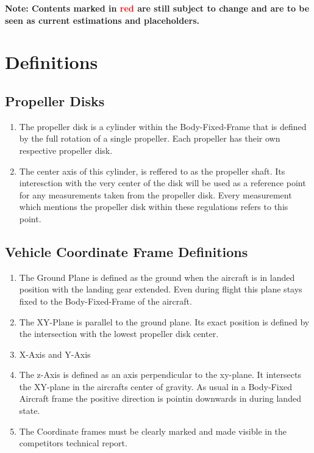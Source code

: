 \documentclass{article}
\begin{document}


\tableofcontents{}
\newpage

{\bf Note: Contents marked in \textcolor{red}{red} are still subject to change and are to be seen as current estimations and placeholders.}

\section{Definitions}

\subsection{Propeller Disks}
\begin{enumerate}
  \item The propeller disk is a cylinder within the Body-Fixed-Frame that is defined by the full rotation of a single propeller. Each propeller has their own respective propeller disk. 
  \item The center axis of this cylinder, is reffered to as the propeller shaft. Its interesction with the very center of the disk will be used as a reference point for any measurements taken from the propeller disk. Every measurement which mentions the propeller disk within these regulations refers to this point.
\end{enumerate}


\subsection{Vehicle Coordinate Frame Definitions}
\begin{enumerate}
  \item The Ground Plane is defined as the ground when the aircraft is in landed position with the landing gear extended. Even during flight this plane stays fixed to the Body-Fixed-Frame of the aircraft.
  \item The XY-Plane is parallel to the ground plane. Its exact position is defined by the intersection with the lowest propeller disk center.
  \item X-Axis and Y-Axis
  \item The z-Axis is defined as an axis perpendicular to the xy-plane. It intersects the XY-plane in the aircrafts center of gravity. As usual in a Body-Fixed Aircraft frame the positive direction is pointin downwards in during landed state.
  \item The Coordinate frames must be clearly marked and made visible in the competitors technical report. 
\end{enumerate}
\end{document}
